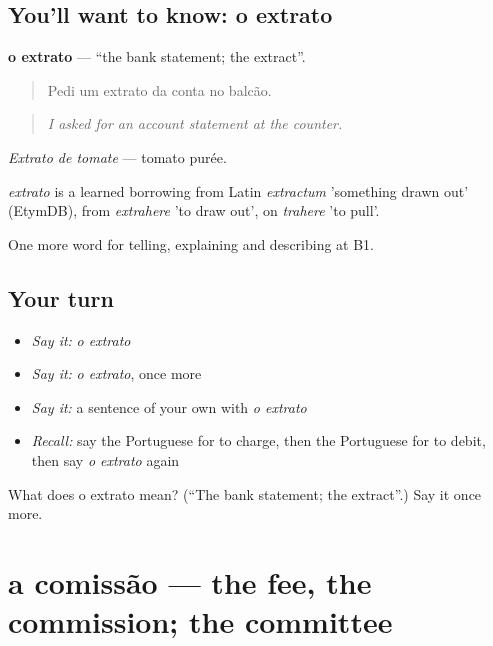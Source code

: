 \subsection*{You'll want to know: o extrato}
\textbf{o extrato} — \textquotedblleft{}the bank statement; the extract\textquotedblright{}.

\begin{quote}
Pedi um extrato da conta no balcão.
\end{quote}

\begin{quote}
\emph{I asked for an account statement at the counter.}
\end{quote}

\emph{Extrato de tomate} — tomato purée.

\begin{cousinweb}
\emph{extrato} is a learned borrowing from Latin \emph{extractum} 'something drawn out' (EtymDB), from \emph{extrahere} 'to draw out', on \emph{trahere} 'to pull'.
\end{cousinweb}

\begin{grammarlens}[title={What you've built}]
One more word for telling, explaining and describing at B1.
\end{grammarlens}

\subsection*{Your turn}
\begin{itemize}
\raggedright
  \item \emph{Say it:} \emph{o extrato}
  \item \emph{Say it:} \emph{o extrato}, once more
  \item \emph{Say it:} a sentence of your own with \emph{o extrato}
  \item \emph{Recall:} say the Portuguese for to charge, then the Portuguese for to debit, then say \emph{o extrato} again
\end{itemize}

\begin{tcolorbox}[breakable,colback=teal!4,colframe=teal!35!black,title={Before you move on}]
What does o extrato mean? (\textquotedblleft{}The bank statement; the extract\textquotedblright{}.) Say it once more.
\end{tcolorbox}
\section[a comissão]{a comissão — the fee, the commission; the committee}

